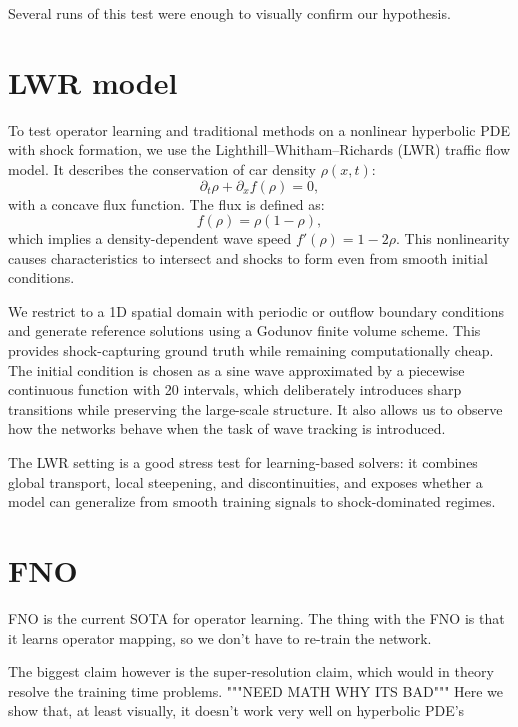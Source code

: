 \documentclass[11pt,a4paper]{article}
\begin{document}
Several runs of this test were enough to visually confirm our hypothesis.

\section{LWR model}

To test operator learning and traditional methods on a nonlinear hyperbolic PDE with shock formation, we use the Lighthill--Whitham--Richards (LWR) traffic flow model. It describes the conservation of car density $\rho(x,t)$:
\[
\partial_t \rho + \partial_x f(\rho) = 0,
\]
with a concave flux function. The flux is defined as:
\[
f(\rho) = \rho(1-\rho),
\]
which implies a density-dependent wave speed $f'(\rho)=1-2\rho$. This nonlinearity causes characteristics to intersect and shocks to form even from smooth initial conditions.

We restrict to a 1D spatial domain with periodic or outflow boundary conditions and generate reference solutions using a Godunov finite volume scheme. This provides shock-capturing ground truth while remaining computationally cheap. The initial condition is chosen as a sine wave approximated by a piecewise continuous function with 20 intervals, which deliberately introduces sharp transitions while preserving the large-scale structure. It also allows us to observe how the networks behave when the task of wave tracking is introduced.

The LWR setting is a good stress test for learning-based solvers: it combines global transport, local steepening, and discontinuities, and exposes whether a model can generalize from smooth training signals to shock-dominated regimes.

\section{FNO}

FNO is the current SOTA for operator learning. The thing with the FNO is that it learns operator mapping, so we don't have to re-train the network.

The biggest claim however is the super-resolution claim, which would in theory resolve the training time problems.
"""NEED MATH WHY ITS BAD"""
Here we show that, at least visually, it doesn't work very well on hyperbolic PDE's
\end{document}
